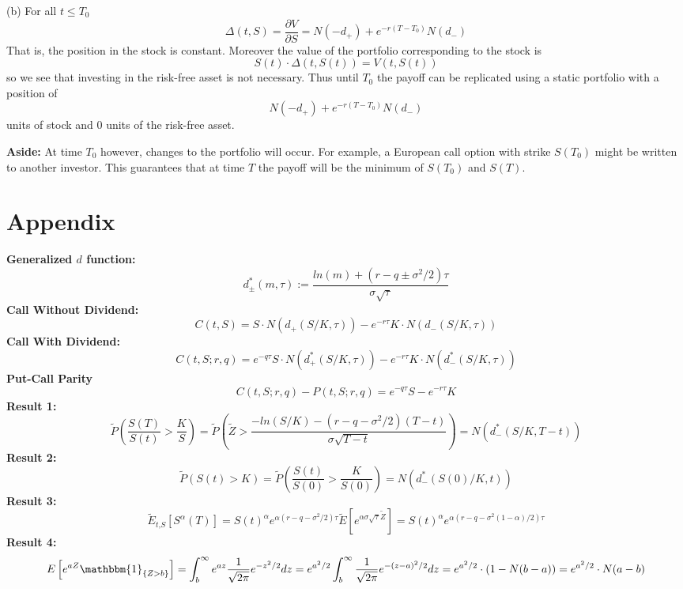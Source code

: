\documentclass{article}[12pt,a4paper]
\begin{document}
\begin{enumerate}
  (b) 
  For all $t \le T_0$
  $$\Delta(t, S) = \frac{\partial V}{\partial S} = N(-d_+) + e^{-r(T - T_0)}N(d_-)$$
  That is, the position in the stock is constant. Moreover the value of the portfolio corresponding to the stock  is
  $$S(t) \cdot \Delta(t, S(t)) = V(t, S(t))$$
  so we see that investing in the risk-free asset is not necessary. 
  Thus until $T_0$ the payoff can be replicated using a static portfolio with a position of
  $$N(-d_+) + e^{-r(T - T_0)}N(d_-)$$
  units of stock and $0$ units of the risk-free asset. \newline
  
  \textbf{Aside:} At time $T_0$ however, changes to the portfolio will occur. 
  For example, a European call option with strike $S(T_0)$ might be written to another investor. 
  This guarantees that at time $T$ the payoff will be the minimum of $S(T_0)$ and $S(T)$.
  \end{enumerate}
  
  \pagebreak
  \section*{Appendix}
  \textbf{Generalized $d$ function:}
  $$d_{\pm}^{*}(m,\tau) := \frac{ln(m) + (r - q \pm \sigma^2/2)\tau}{\sigma\sqrt\tau}$$
  \newline \textbf{Call Without Dividend:} 
  $$C(t, S) = S\cdot N(d_+(S/K,\tau)) - e^{-r\tau}K\cdot N(d_-(S/K, \tau))$$
  \newline \textbf{Call With Dividend:} 
  $$C(t, S ; r, q) = e^{-q\tau}S\cdot N(d^*_+(S/K, \tau)) - e^{-r\tau}K\cdot N(d^*_-(S/K,\tau))$$
  \newline \textbf{Put-Call Parity}
  $$C(t,S;r,q) - P(t,S;r,q) = e^{-q\tau}S - e^{-r\tau}K$$
  \newline\textbf{Result 1:}
  $$\widetilde{P}(\frac{S(T)}{S(t)} > \frac{K}{S}) = 
  \widetilde{P}(\widetilde{Z} > \frac{-ln(S/K) - (r - q - \sigma^2/2)(T - t)}{\sigma\sqrt{T - t}}) = N(d^*_-(S/K,T - t))$$ \newline
  \textbf{Result 2:}
  $$\widetilde{P}(S(t) > K) = \widetilde{P}(\frac{S(t)}{S(0)} > \frac{K}{S(0)}) = N(d_-^*(S(0)/K,t))$$ \newline
  \textbf{Result 3:}
  $$\widetilde{E}_{t\mbox{,}S}\left[ S^{\alpha}(T) \right] = 
   S(t)^\alpha e^{\alpha(r - q - \sigma^2/2)\tau} \widetilde{E}\left[ e^{\alpha \sigma \sqrt\tau \widetilde{Z}}\right] =
    S(t)^\alpha e^{\alpha(r - q - \sigma^2(1  - \alpha)/2 )\tau}$$ 
    \newline \textbf{Result 4:}
    $$
    E \left[ e^{aZ} \mathbbm{1}_{\{ Z > b \}} \right] = 
    \int_b^{\infty} { e^{az} \frac{1}{\sqrt{2\pi}} e^{-z^2/2} dz} = 
    e^{a^2/2}\int_{b}^{\infty}{\frac{1}{\sqrt{2\pi}}  e^{-(z - a)^2/2} dz} = 
    e^{a^2/2} \cdot (1 - N(b - a)) = e^{a^2/2} \cdot N(a - b)$$
\end{document}
